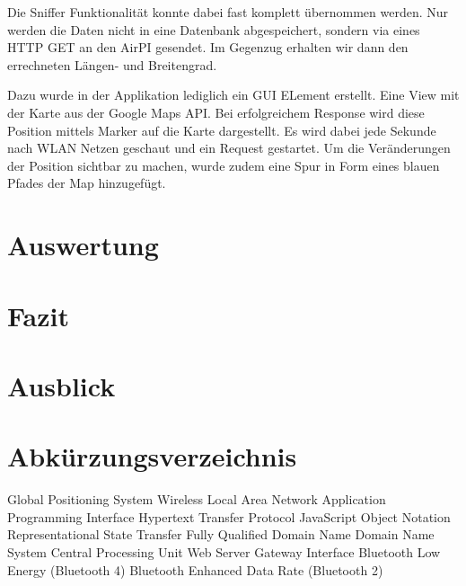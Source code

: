 \documentclass[11pt,a4paper]{article}
\begin{document}
Die Sniffer Funktionalität konnte dabei fast komplett übernommen werden. Nur werden die Daten nicht in eine Datenbank abgespeichert, sondern via eines HTTP GET an den AirPI gesendet. Im Gegenzug erhalten wir dann den errechneten Längen- und Breitengrad. 

Dazu wurde in der Applikation lediglich ein GUI ELement erstellt. Eine View mit der Karte aus der Google Maps API. Bei erfolgreichem Response wird diese Position mittels Marker auf die Karte dargestellt. Es wird dabei jede Sekunde nach WLAN Netzen geschaut und ein Request gestartet. Um die Veränderungen der Position sichtbar zu machen, wurde zudem eine Spur in Form eines blauen Pfades der Map hinzugefügt. 

\section{Auswertung}


\section{Fazit}


\section{Ausblick}



\newpage
\section{Abkürzungsverzeichnis}

\begin{acronym}
 		{Global Positioning System}
 	{Wireless Local Area Network} 
 		{Application Programming Interface}
 	{Hypertext Transfer Protocol}
 	{JavaScript Object Notation}
 	{Representational State Transfer}
 	{Fully Qualified Domain Name}
 		{Domain Name System}
 		{Central Processing Unit}
 	{Web Server Gateway Interface}
 	{Bluetooth Low Energy (Bluetooth 4)}
 	{Bluetooth Enhanced Data Rate (Bluetooth 2)} 
\end{acronym}
\end{document}
